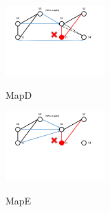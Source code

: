 \begin{figure}
  \centering
  \includegraphics[width=1.5in]{Fig/MapD}\\
  \caption{MapD}\label{Fig:MapD}
\end{figure}


\begin{figure}
  \centering
  \includegraphics[width=1.5in]{Fig/MapE}\\
  \caption{MapE}\label{Fig:MapE}
\end{figure}
